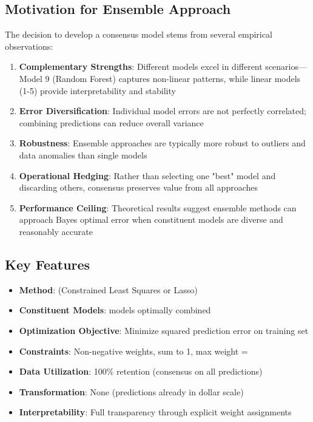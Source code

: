 \subsection{Motivation for Ensemble Approach}

The decision to develop a consensus model stems from several empirical observations:

\begin{enumerate}
    \item \textbf{Complementary Strengths}: Different models excel in different scenarios---Model 9 (Random Forest) captures non-linear patterns, while linear models (1-5) provide interpretability and stability
    
    \item \textbf{Error Diversification}: Individual model errors are not perfectly correlated; combining predictions can reduce overall variance
    
    \item \textbf{Robustness}: Ensemble approaches are typically more robust to outliers and data anomalies than single models
    
    \item \textbf{Operational Hedging}: Rather than selecting one "best" model and discarding others, consensus preserves value from all approaches
    
    \item \textbf{Performance Ceiling}: Theoretical results suggest ensemble methods can approach Bayes optimal error when constituent models are diverse and reasonably accurate
\end{enumerate}

\subsection{Key Features}

\begin{itemize}
    \item \textbf{Method}: \ModelElevenMethod{} (Constrained Least Squares or Lasso)
    \item \textbf{Constituent Models}: \ModelElevenModelsIncluded{} models optimally combined
    \item \textbf{Optimization Objective}: Minimize squared prediction error on training set
    \item \textbf{Constraints}: Non-negative weights, sum to 1, max weight = \ModelElevenMaxWeight{}
    \item \textbf{Data Utilization}: 100\% retention (consensus on all predictions)
    \item \textbf{Transformation}: None (predictions already in dollar scale)
    \item \textbf{Interpretability}: Full transparency through explicit weight assignments
\end{itemize}

